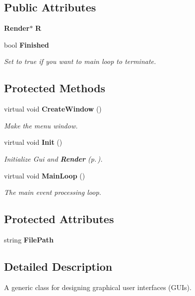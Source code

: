 \subsection*{Public Attributes}
\begin{CompactItemize}
\item 
{\bf Render}$\ast$ {\bf R}
\item 
bool {\bf Finished}
\begin{CompactList}\small\item\em Set to true if you want to main loop to terminate.\item\end{CompactList}\end{CompactItemize}
\subsection*{Protected Methods}
\begin{CompactItemize}
\item 
virtual void {\bf Create\-Window} ()
\begin{CompactList}\small\item\em Make the menu window.\item\end{CompactList}\item 
virtual void {\bf Init} ()
\begin{CompactList}\small\item\em Initialize Gui and {\bf Render} {\rm (p.\,\pageref{class_Render})}.\item\end{CompactList}\item 
virtual void {\bf Main\-Loop} ()
\begin{CompactList}\small\item\em The main event processing loop.\item\end{CompactList}\end{CompactItemize}
\subsection*{Protected Attributes}
\begin{CompactItemize}
\item 
string {\bf File\-Path}
\end{CompactItemize}


\subsection{Detailed Description}
A generic class for designing graphical user interfaces (GUIs).

